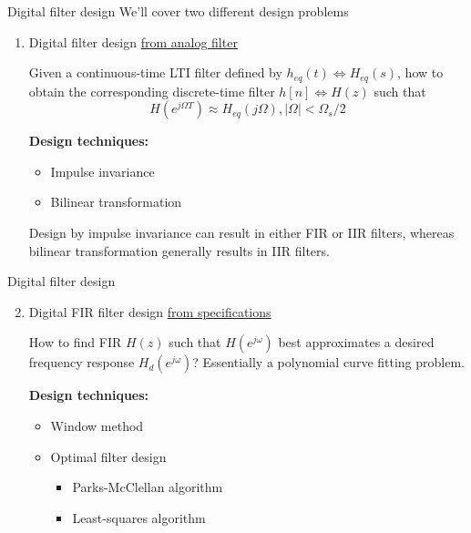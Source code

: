 \documentclass[10pt]{beamer}
\begin{document}
\begin{frame}{Digital filter design}
	We'll cover two different design problems
	\begin{enumerate}
		\item Digital filter design \underline{from analog filter}
		
		Given a continuous-time LTI filter defined by $h_{eq}(t) \Longleftrightarrow H_{eq}(s)$, how to obtain the corresponding discrete-time filter $h[n] \Longleftrightarrow H(z)$ such that
		\begin{equation*}
			H(e^{j\Omega T}) \approx H_{eq}(j\Omega), |\Omega| < \Omega_s/2
		\end{equation*}
		
		\textbf{Design techniques:}
		\begin{itemize}\normalsize
			\item Impulse invariance
			\item Bilinear transformation
		\end{itemize}
		Design by impulse invariance can result in either FIR or IIR filters, whereas bilinear transformation generally results in IIR filters. 
	\end{enumerate}
\end{frame}

%
\begin{frame}{Digital filter design}
\begin{enumerate}\setcounter{enumi}{1}
	\item Digital FIR filter design \underline{from specifications}
	
	How to find FIR $H(z)$ such that $H(e^{j\omega})$ best approximates a desired frequency response $H_d(e^{j\omega})$? Essentially a polynomial curve fitting problem.
	\begin{center}
		\resizebox{0.6\linewidth}{!}{}
	\end{center}
	
	\textbf{Design techniques:}
	\begin{itemize}
		\item Window method
		\item Optimal filter design
		\begin{itemize}
			\item Parks-McClellan algorithm
			\item Least-squares algorithm
		\end{itemize}
	\end{itemize}
\end{enumerate}
\end{frame}
\end{document}
